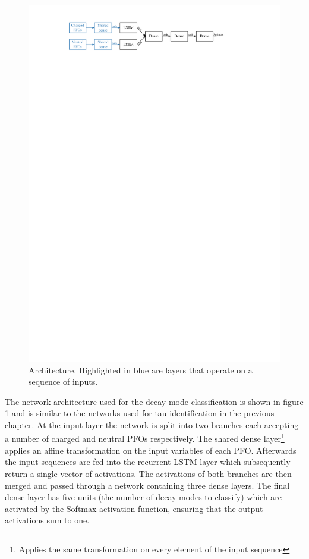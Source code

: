 \begin{figure}[htb]
  \centering
  \includegraphics{./figures/decay_mode_classification/baseline_architecture.pdf}
  \caption{Architecture. Highlighted in blue are layers that operate on a sequence of inputs.}
  \label{fig:pfo_rnn_baseline_arch}
\end{figure}

The network architecture used for the decay mode classification is shown in
figure \ref{fig:pfo_rnn_baseline_arch} and is similar to the networks used for
tau-identification in the previous chapter. At the input layer the network is
split into two branches each accepting a number of charged and neutral PFOs
respectively. The shared dense layer\footnote{Applies the same transformation on
  every element of the input sequence} applies an affine transformation on the
input variables of each PFO. Afterwards the input sequences are fed into the
recurrent LSTM layer which subsequently return a single vector of activations.
The activations of both branches are then merged and passed through a network
containing three dense layers. The final dense layer has five units (the number
of decay modes to classify) which are activated by the Softmax activation
function, ensuring that the output activations sum to one.

